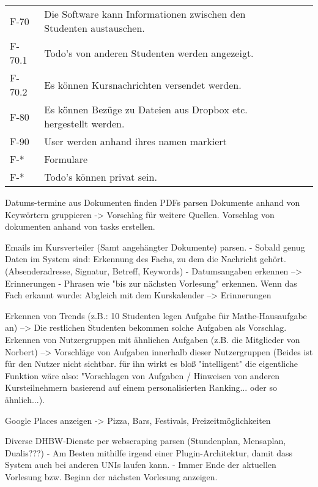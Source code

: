 \begin{table}[H]
\begin{longtable}{|l|l|l|l}
        F-70 & Die Software kann Informationen zwischen den Studenten austauschen. & & \\
        F-70.1 & Todo's von anderen Studenten werden angezeigt. & &\\
        F-70.2 & Es können Kursnachrichten versendet werden. & &\\
        F-80 & Es können Bezüge zu Dateien aus Dropbox etc. hergestellt werden. & &\\
        F-90 & User werden anhand ihres namen markiert & &\\ %

        F-* & Formulare & &\\

        F-* & Todo's können privat sein. & & \\

        




        \hline
    \end{longtable}
\end{table}

Datums-termine aus Dokumenten finden
PDFs parsen
Dokumente anhand von Keywörtern gruppieren -> Vorschlag für weitere Quellen.
Vorschlag von dokumenten anhand von tasks erstellen.

Emails im Kursverteiler (Samt angehängter Dokumente) parsen.
    - Sobald genug Daten im System sind: Erkennung des Fachs, zu dem die Nachricht gehört. (Absenderadresse, Signatur, Betreff, Keywords)
    - Datumsangaben erkennen --> Erinnerungen
    - Phrasen wie "bis zur nächsten Vorlesung" erkennen. Wenn das Fach erkannt wurde: Abgleich mit dem Kurskalender --> Erinnerungen

Erkennen von Trends (z.B.: 10 Studenten legen Aufgabe für Mathe-Hausaufgabe an)
    --> Die restlichen Studenten bekommen solche Aufgaben als Vorschlag.
Erkennen von Nutzergruppen mit ähnlichen Aufgaben (z.B. die Mitglieder von Norbert)
    --> Vorschläge von Aufgaben innerhalb dieser Nutzergruppen
(Beides ist für den Nutzer nicht sichtbar. für ihn wirkt es bloß "intelligent" die eigentliche 
Funktion wäre also: "Vorschlagen von Aufgaben / Hinweisen von anderen Kursteilnehmern basierend
auf einem personalisierten Ranking... oder so ähnlich...).

Google Places anzeigen -> Pizza, Bars, Festivals, Freizeitmöglichkeiten

Diverse DHBW-Dienste per webscraping parsen (Stundenplan, Mensaplan, Dualis???) - Am Besten mithilfe irgend einer Plugin-Architektur, damit dass System auch bei anderen UNIs laufen kann.
    - Immer Ende der aktuellen Vorlesung bzw. Beginn der nächsten Vorlesung anzeigen.

